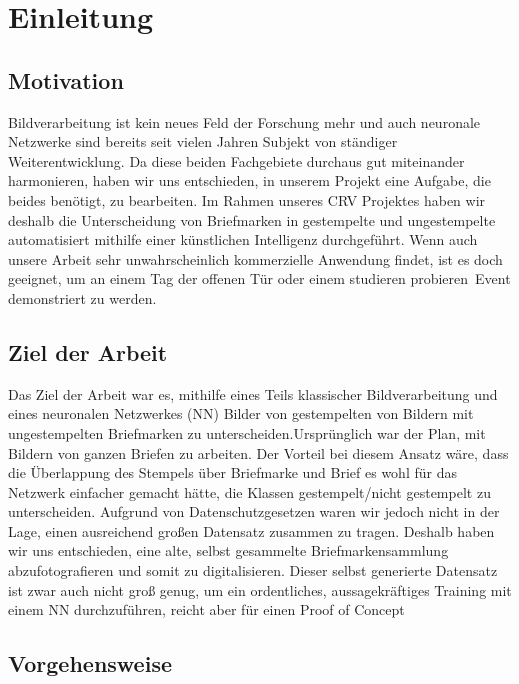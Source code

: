 \documentclass[12pt,toc=bib,toc=listof]{scrreprt}
\begin{document}
\chapter{Einleitung} %
\label{sec:einleitung}

\section{Motivation} %
\label{sec:motivation}
Bildverarbeitung ist kein neues Feld der Forschung mehr und auch neuronale Netzwerke sind bereits seit vielen Jahren Subjekt von ständiger Weiterentwicklung. Da diese beiden Fachgebiete durchaus gut miteinander harmonieren, haben wir uns entschieden, in unserem Projekt eine Aufgabe, die beides benötigt, zu bearbeiten. Im Rahmen unseres CRV Projektes haben wir deshalb die Unterscheidung von Briefmarken in gestempelte und ungestempelte automatisiert mithilfe einer künstlichen Intelligenz durchgeführt. Wenn auch unsere Arbeit sehr unwahrscheinlich kommerzielle Anwendung findet, ist es doch geeignet, um an einem Tag der offenen Tür oder einem \dq studieren probieren\dq\ Event demonstriert zu werden.


\section{Ziel der Arbeit} %
\label{sec:ziel_der_arbeit}
Das Ziel der Arbeit war es, mithilfe eines Teils klassischer Bildverarbeitung und eines neuronalen Netzwerkes (NN) Bilder von gestempelten von Bildern mit ungestempelten Briefmarken zu unterscheiden.Ursprünglich war der Plan, mit Bildern von ganzen Briefen zu arbeiten. Der Vorteil bei diesem Ansatz wäre, dass die Überlappung des Stempels über Briefmarke und Brief es wohl für das Netzwerk einfacher gemacht hätte, die Klassen gestempelt/nicht gestempelt zu unterscheiden. Aufgrund von Datenschutzgesetzen waren wir jedoch nicht in der Lage, einen ausreichend großen Datensatz zusammen zu tragen. Deshalb haben wir uns entschieden, eine alte, selbst gesammelte Briefmarkensammlung abzufotografieren und somit zu digitalisieren.
Dieser selbst generierte Datensatz ist zwar auch nicht groß genug, um ein ordentliches, aussagekräftiges Training mit einem NN durchzuführen, reicht aber für einen \dq Proof of Concept\dq\


\section{Vorgehensweise} %
\label{sec:vorgehensweise}
\end{document}
